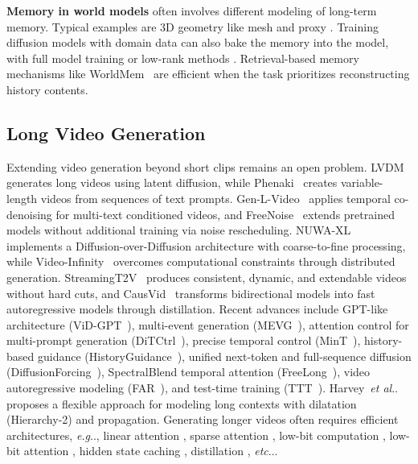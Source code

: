 \documentclass{article}
\makeatletter
\DeclareRobustCommand\onedot{\futurelet\@let@token\@onedot}
\def\@onedot{\ifx\@let@token.\else.\null\fi\xspace}
\def\eg{\emph{e.g}\onedot}
\def\etal{\emph{et al}\onedot}
\def\etc{\emph{etc}\onedot}
\makeatother
\begin{document}
\textbf{Memory in world models} often involves different modeling of long-term memory. Typical examples are 3D geometry like mesh and proxy \cite{ren2025gen3c3dinformedworldconsistentvideo, wang2024spann3r, yu2025wonderworld, yu2024wonderjourney}. Training diffusion models with domain data can also bake the memory into the model, with full model training \cite{alonso2024diffusionworldmodelingvisual, valevski2024diffusionmodelsrealtimegame} or low-rank methods \cite{hong2024slowfastvgenslowfastlearningactiondriven}. Retrieval-based memory mechanisms like WorldMem~\cite{xiao2025worldmemlongtermconsistentworld} are efficient when the task prioritizes reconstructing history contents.

\subsection{Long Video Generation}
Extending video generation beyond short clips remains an open problem. LVDM~\cite{he2022latent} generates long videos using latent diffusion, while Phenaki~\cite{villegas2022phenaki} creates variable-length videos from sequences of text prompts. Gen-L-Video~\cite{wang2023gen} applies temporal co-denoising for multi-text conditioned videos, and FreeNoise~\cite{qiu2023freenoise} extends pretrained models without additional training via noise rescheduling. NUWA-XL~\cite{yin2023nuwa} implements a Diffusion-over-Diffusion architecture with coarse-to-fine processing, while Video-Infinity~\cite{tan2024video} overcomes computational constraints through distributed generation. StreamingT2V~\cite{henschel2024streamingt2v} produces consistent, dynamic, and extendable videos without hard cuts, and CausVid~\cite{yin2024slow} transforms bidirectional models into fast autoregressive models through distillation. Recent advances include GPT-like architecture (ViD-GPT~\cite{gao2024vidgptintroducinggptstyleautoregressive}), multi-event generation (MEVG~\cite{oh2024mevg}), attention control for multi-prompt generation (DiTCtrl~\cite{cai2024ditctrl}), precise temporal control (MinT~\cite{wu2024mind}), history-based guidance (HistoryGuidance~\cite{song2025history}), unified next-token and full-sequence diffusion (DiffusionForcing~\cite{chen2025diffusion}), SpectralBlend temporal attention (FreeLong~\cite{lu2025freelong}), video autoregressive modeling (FAR~\cite{gu2025longcontextautoregressivevideomodeling}), and test-time training (TTT~\cite{dalal2025oneminutevideogenerationtesttime}).
Harvey~\etal~\cite{harvey2022flexiblediffusionmodelinglong} proposes a flexible approach for modeling long contexts with dilatation (Hierarchy-2) and propagation.
Generating longer videos often requires efficient architectures, \eg, linear attention \cite{cai2023efficientvit,xie2024sana,wang2020linformer,choromanski2020rethinking,yu2022metaformer,katharopoulos2020transformers}, sparse attention \cite{xi2025sparse, zhang2025spargeattn, zhang2025sta, xia2025trainingfree}, low-bit computation \cite{li2023q, zhao2024vidit, li2024svdquant}, low-bit attention \cite{zhang2025sageattention,zhang2024sageattention2}, hidden state caching \cite{lv2024fastercache, liu2024timestep}, distillation \cite{song2023consistency, luo2023latent,yin2024improved, yin2024one}, \etc.
\end{document}
